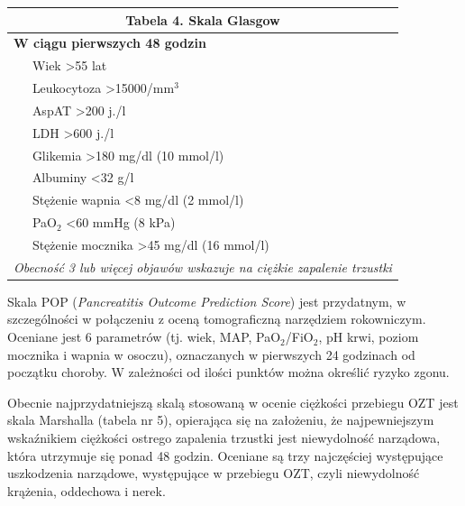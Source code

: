 \documentclass[a4paper, 12pt]{report}
\begin{document}
\begin{table}[!h]
\begin{center}
\begin{footnotesize}
\begin{tabular}{|l l|}
\hline
\multicolumn{2}{|c|}{\cellcolor[gray]{0.9} \textbf{Tabela 4. Skala Glasgow}}\\
\hline \hline
\multicolumn{2}{|l|}{\textbf{W ciągu pierwszych 48 godzin}}\\
\hline
 & Wiek >55 lat\\
 & Leukocytoza >15000/mm$^3$\\
 & AspAT >200 j./l\\
 & LDH >600 j./l\\
 & Glikemia >180 mg/dl (10 mmol/l)\\
 & Albuminy <32 g/l\\
 & Stężenie wapnia <8 mg/dl (2 mmol/l)\\
 & PaO$_2$ <60 mmHg (8 kPa)\\
 & Stężenie mocznika >45 mg/dl (16 mmol/l)\\
\hline \hline
\multicolumn{2}{|p{10cm}|}{\textsl{Obecność 3 lub więcej objawów wskazuje na ciężkie
  zapalenie trzustki}}\\
\hline
\end{tabular}
\end{footnotesize}
\end{center}
\end{table}

Skala POP (\textsl{Pancreatitis Outcome Prediction Score}) jest
przydatnym, w szczególności w połączeniu z oceną tomograficzną
narzędziem rokowniczym. Oceniane jest 6 parametrów (tj. wiek, MAP,
PaO$_2$/FiO$_2$, pH krwi, poziom mocznika i wapnia w osoczu),
oznaczanych w pierwszych 24 godzinach od początku choroby. W
zależności od ilości punktów można określić ryzyko zgonu.

Obecnie najprzydatniejszą skalą stosowaną w ocenie ciężkości przebiegu
OZT jest skala Marshalla (tabela nr 5), opierająca się na założeniu,
że najpewniejszym wskaźnikiem ciężkości ostrego zapalenia trzustki
jest niewydolność narządowa, która utrzymuje się ponad 48 godzin.
Oceniane są trzy najczęściej występujące uszkodzenia narządowe,
występujące w przebiegu OZT, czyli niewydolność krążenia, oddechowa i
nerek.
\end{document}
